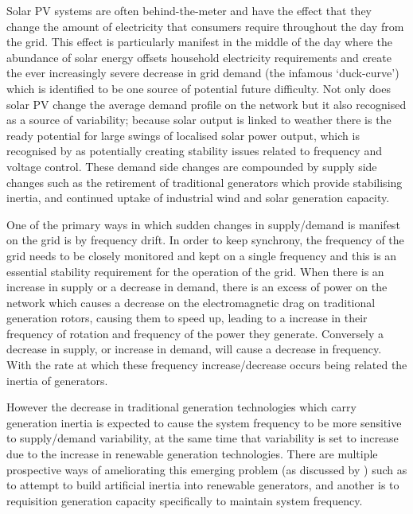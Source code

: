 Solar PV systems are often behind-the-meter and have the effect that they change the amount of electricity that consumers require throughout the day from the grid.
This effect is particularly manifest in the middle of the day where the abundance of solar energy offsets household electricity requirements and create the ever increasingly severe decrease in grid demand (the infamous `duck-curve') which is identified to be one source of potential future difficulty.
Not only does solar PV change the average demand profile on the network but it also recognised as a source of variability; because solar output is linked to weather there is the ready potential for large swings of localised solar power output, which is recognised by \cite{australianenergymarketoperatorlimited2018} as potentially creating stability issues related to frequency and voltage control.
These demand side changes are compounded by supply side changes such as the retirement of traditional generators which provide stabilising inertia, and continued uptake of industrial wind and solar generation capacity.

One of the primary ways in which sudden changes in supply/demand is manifest on the grid is by frequency drift.
In order to keep synchrony, the frequency of the grid needs to be closely monitored and kept on a single frequency and this is an essential stability requirement for the operation of the grid.
When there is an increase in supply or a decrease in demand, there is an excess of power on the network which causes a decrease on the electromagnetic drag on traditional generation rotors, causing them to speed up, leading to a increase in their frequency of rotation and frequency of the power they generate.
Conversely a decrease in supply, or increase in demand, will cause a decrease in frequency. With the rate at which these frequency increase/decrease occurs being related the inertia of generators.

However the decrease in traditional generation technologies which carry generation inertia is expected to cause the system frequency to be more sensitive to supply/demand variability, at the same time that variability is set to increase due to the increase in renewable generation technologies.
There are multiple prospective ways of ameliorating this emerging problem (as discussed by \cite{doi:10.1002/2050-7038.12128}) such as to attempt to build artificial inertia into renewable generators, and another is to requisition generation capacity specifically to maintain system frequency.


